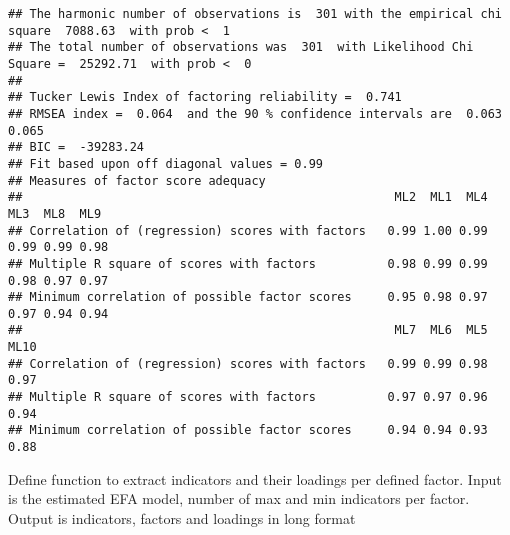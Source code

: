 \documentclass[
]{article}
\begin{document}
\begin{verbatim}
## The harmonic number of observations is  301 with the empirical chi square  7088.63  with prob <  1 
## The total number of observations was  301  with Likelihood Chi Square =  25292.71  with prob <  0 
## 
## Tucker Lewis Index of factoring reliability =  0.741
## RMSEA index =  0.064  and the 90 % confidence intervals are  0.063 0.065
## BIC =  -39283.24
## Fit based upon off diagonal values = 0.99
## Measures of factor score adequacy             
##                                                    ML2  ML1  ML4  ML3  ML8  ML9
## Correlation of (regression) scores with factors   0.99 1.00 0.99 0.99 0.99 0.98
## Multiple R square of scores with factors          0.98 0.99 0.99 0.98 0.97 0.97
## Minimum correlation of possible factor scores     0.95 0.98 0.97 0.97 0.94 0.94
##                                                    ML7  ML6  ML5 ML10
## Correlation of (regression) scores with factors   0.99 0.99 0.98 0.97
## Multiple R square of scores with factors          0.97 0.97 0.96 0.94
## Minimum correlation of possible factor scores     0.94 0.94 0.93 0.88
\end{verbatim}

Define function to extract indicators and their loadings per defined
factor. Input is the estimated EFA model, number of max and min
indicators per factor. Output is indicators, factors and loadings in
long format
\end{document}
